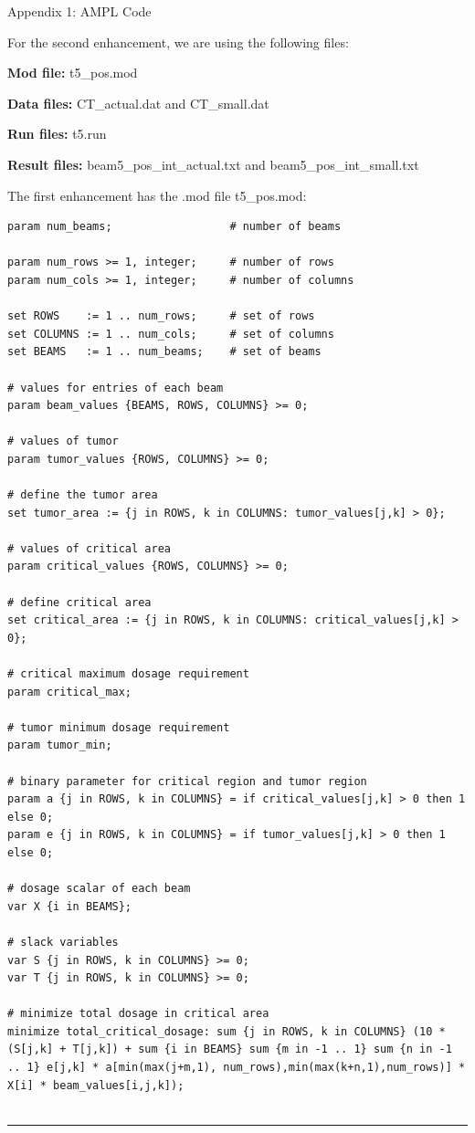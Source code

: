 \documentclass[12pt]{article}
\makeatletter
\newenvironment{task}{\@startsection
       {section}{1}
       {0.4em}{-.5ex plus -1ex minus -.2ex}{.5ex plus .2ex}
       {\pagebreak[3]\large\bf\noindent{Task}}}
       {\nopagebreak[3]\vspace{3ex}\begin{center}\rule{1\linewidth}{.3pt}\end{center}}
\makeatother
\begin{document}
\begin{task}{Appendix 1: AMPL Code}
\begin{enumerate}
For the second enhancement, we are using the following files:

\begin{list}{*}{}
	\item \textbf{Mod file:} t5\_pos.mod 
	\item \textbf{Data files:} CT\_actual.dat and CT\_small.dat
	\item \textbf{Run files:} t5.run
	\item  \textbf{Result files:} beam5\_pos\_int\_actual.txt and beam5\_pos\_int\_small.txt
\end{list}

The first enhancement has the .mod file t5\_pos.mod:

\begin{lstlisting}
param num_beams;                  # number of beams

param num_rows >= 1, integer;     # number of rows
param num_cols >= 1, integer;     # number of columns 

set ROWS    := 1 .. num_rows;	  # set of rows
set COLUMNS := 1 .. num_cols;	  # set of columns
set BEAMS   := 1 .. num_beams;    # set of beams

# values for entries of each beam
param beam_values {BEAMS, ROWS, COLUMNS} >= 0; 

# values of tumor
param tumor_values {ROWS, COLUMNS} >= 0; 

# define the tumor area 
set tumor_area := {j in ROWS, k in COLUMNS: tumor_values[j,k] > 0};

# values of critical area
param critical_values {ROWS, COLUMNS} >= 0; 

# define critical area 
set critical_area := {j in ROWS, k in COLUMNS: critical_values[j,k] > 0};

# critical maximum dosage requirement
param critical_max;

# tumor minimum dosage requirement
param tumor_min;

# binary parameter for critical region and tumor region
param a {j in ROWS, k in COLUMNS} = if critical_values[j,k] > 0 then 1 else 0;
param e {j in ROWS, k in COLUMNS} = if tumor_values[j,k] > 0 then 1 else 0;

# dosage scalar of each beam
var X {i in BEAMS};

# slack variables
var S {j in ROWS, k in COLUMNS} >= 0;
var T {j in ROWS, k in COLUMNS} >= 0;

# minimize total dosage in critical area
minimize total_critical_dosage: sum {j in ROWS, k in COLUMNS} (10 * (S[j,k] + T[j,k]) + sum {i in BEAMS} sum {m in -1 .. 1} sum {n in -1 .. 1} e[j,k] * a[min(max(j+m,1), num_rows),min(max(k+n,1),num_rows)] * X[i] * beam_values[i,j,k]);


\end{lstlisting}
\end{enumerate}
\end{task}
\end{document}
